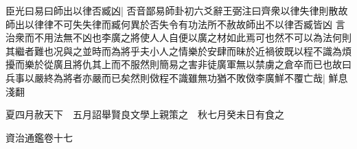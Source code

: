 臣光曰易曰師出以律否臧凶|{
	否音鄙易師卦初六爻辭王弼注曰齊衆以律失律則散故師出以律律不可失失律而臧何異於否失令有功法所不赦故師出不以律否臧皆凶}
言治衆而不用法無不凶也李廣之將使人人自便以廣之材如此焉可也然不可以為法何則其繼者難也况與之並時而為將乎夫小人之情樂於安肆而昧於近禍彼既以程不識為煩擾而樂於從廣且將仇其上而不服然則簡易之害非徒廣軍無以禁虜之倉卒而已也故曰兵事以嚴終為將者亦嚴而已矣然則傚程不識雖無功猶不敗傚李廣鮮不覆亡哉|{
	鮮息淺翻}


夏四月赦天下　五月詔舉賢良文學上親策之　秋七月癸未日有食之

資治通鑑卷十七














































































































































